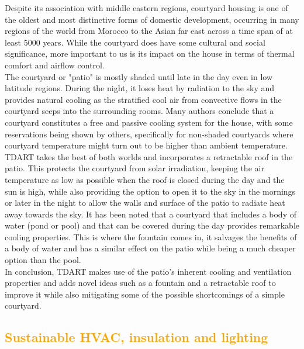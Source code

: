 \documentclass[justified]{tufte-book}
\begin{document}
	
	Despite its association with middle eastern regions, courtyard housing is one of the oldest and most distinctive forms of domestic development, occurring in many regions of the world from Morocco to the Asian far east across a time span of at least 5000 years\cite{edwards2006courtyard}. While the courtyard does have some cultural and social significance, more important to us is its impact on the house in terms of thermal comfort and airflow control.\\
	The courtyard or "patio" is mostly shaded until late in the day even in low latitude regions. During the night, it loses heat by radiation to the sky\cite{batty1991natural} and provides natural cooling as the stratified cool air from convective flows in the courtyard seeps into the surrounding rooms. Many authors\cite{scudo1988climatic,fathy1986natural} conclude that a courtyard constitutes a free and passive cooling system for the house, with some reservations being shown by others\cite{etzion1990thermal}, specifically for non-shaded courtyards where courtyard temperature might turn out to be higher than ambient temperature. TDART takes the best of both worlds and incorporates a retractable roof in the patio. This protects the courtyard from solar irradiation, keeping the air temperature as low as possible when the roof is closed during the day and the sun is high, while also providing the option to open it to the sky in the mornings or later in the night to allow the walls and surface of the patio to radiate heat away towards the sky. It has been noted that a courtyard that includes a body of water (pond or pool) and that can be covered during the day provides remarkable cooling properties\cite{al2001effect}. This is where the fountain comes in, it salvages the benefits of a body of water and has a similar effect on the patio while being a much cheaper option than the pool.\\
	In conclusion, TDART makes use of the patio's inherent cooling and ventilation properties and adds novel ideas such as a fountain and a retractable roof to improve it while also mitigating some of the possible shortcomings of a simple courtyard.
	
	\textcolor{orange}{\chapter{Sustainable HVAC, insulation and lighting}}
	
\end{document}
